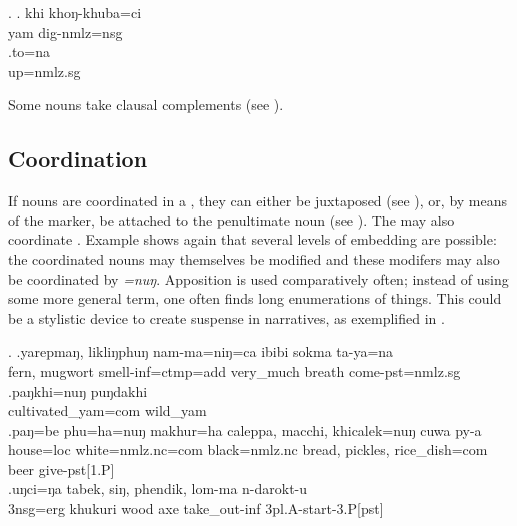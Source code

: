 \ex. \ag.  khi khoŋ-khuba=ci\\
yam dig{\sc -nmlz=nsg}\\
 
\bg.to=na\\
up{\sc =nmlz.sg}\\

Some nouns take clausal complements (see ).

\subsection{Coordination}\label{str-np-coord}

If nouns are coordinated in a , they can either be juxtaposed (see \Next[a]), or, by means of the   marker, be attached to the penultimate noun (see \Next[b]). The  may also coordinate . Example \Next[c] shows again that several levels of embedding are possible: the coordinated nouns may themselves be modified and these modifers may also be coordinated by \emph{=nuŋ}. Apposition is used comparatively often; instead of using some more general term, one often finds long enumerations of things. This could be a stylistic device to create suspense in narratives, as exemplified in \Next[d].

\ex. \ag.yarepmaŋ, likliŋphuŋ nam-ma=niŋ=ca   ibibi     sokma  ta-ya=na\\
fern, mugwort smell{\sc -inf=ctmp=add} very\_much breath come{\sc [3sg]-pst=nmlz.sg}\\
 
\bg.paŋkhi=nuŋ   puŋdakhi     \\
cultivated\_yam{\sc =com} wild\_yam\\
 
\bg.paŋ=be     phu=ha=nuŋ      makhur=ha         caleppa, macchi,  khicalek=nuŋ      cuwa py-a \\
house{\sc =loc} white{\sc =nmlz.nc=com}  black{\sc =nmlz.nc} bread, pickles, rice\_dish{\sc =com} beer give{\sc -pst[1.P]}\\
 
\bg.uŋci=ŋa   tabek,   siŋ,     phendik, lom-ma         n-darokt-u\\
{\sc 3nsg=erg} khukuri wood axe take\_out{\sc -inf} {\sc 3pl.A-}start{\sc -3.P[pst]}\\
 

